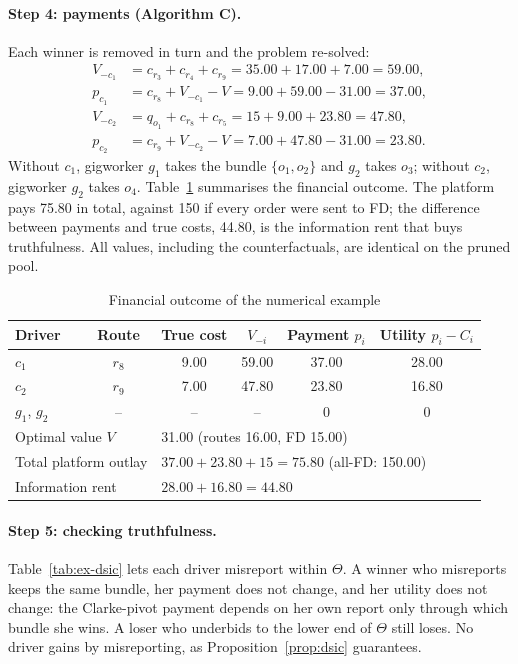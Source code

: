 \paragraph{Step 4: payments (Algorithm C).} Each winner is removed in turn
and the problem re-solved:
\begin{align*}
V_{-c_1}&=c_{r_3}+c_{r_4}+c_{r_9}=35.00+17.00+7.00=59.00,\\
p_{c_1}&=c_{r_8}+V_{-c_1}-V=9.00+59.00-31.00=37.00,\\
V_{-c_2}&=q_{o_1}+c_{r_8}+c_{r_5}=15+9.00+23.80=47.80,\\
p_{c_2}&=c_{r_9}+V_{-c_2}-V=7.00+47.80-31.00=23.80.
\end{align*}
Without $c_1$, gigworker $g_1$ takes the bundle $\{o_1,o_2\}$ and $g_2$ takes
$o_3$; without $c_2$, gigworker $g_2$ takes $o_4$. Table~\ref{tab:ex-money}
summarises the financial outcome. The platform pays 75.80 in total, against
150 if every order were sent to FD; the difference between payments and true
costs, 44.80, is the information rent that buys truthfulness. All values,
including the counterfactuals, are identical on the pruned pool.

\begin{table}[t]
\centering
\caption{Financial outcome of the numerical example}
\label{tab:ex-money}
\small
\begin{tabular}{lccccc}
\toprule
Driver & Route & True cost & $V_{-i}$ & Payment $p_i$ & Utility $p_i-C_i$\\
\midrule
$c_1$ & $r_8$ & 9.00 & 59.00 & 37.00 & 28.00\\
$c_2$ & $r_9$ & 7.00 & 47.80 & 23.80 & 16.80\\
$g_1$, $g_2$ & -- & -- & -- & 0 & 0\\
\midrule
\multicolumn{2}{l}{Optimal value $V$} & \multicolumn{4}{l}{31.00 (routes 16.00, FD 15.00)}\\
\multicolumn{2}{l}{Total platform outlay} & \multicolumn{4}{l}{$37.00+23.80+15=75.80$ (all-FD: 150.00)}\\
\multicolumn{2}{l}{Information rent} & \multicolumn{4}{l}{$28.00+16.80=44.80$}\\
\bottomrule
\end{tabular}
\end{table}

\paragraph{Step 5: checking truthfulness.} Table~\ref{tab:ex-dsic} lets each
driver misreport within $\Theta$. A winner who misreports keeps the same
bundle, her payment does not change, and her utility does not change: the
Clarke-pivot payment depends on her own report only through which bundle she
wins. A loser who underbids to the lower end of $\Theta$ still loses. No
driver gains by misreporting, as Proposition~\ref{prop:dsic} guarantees.

